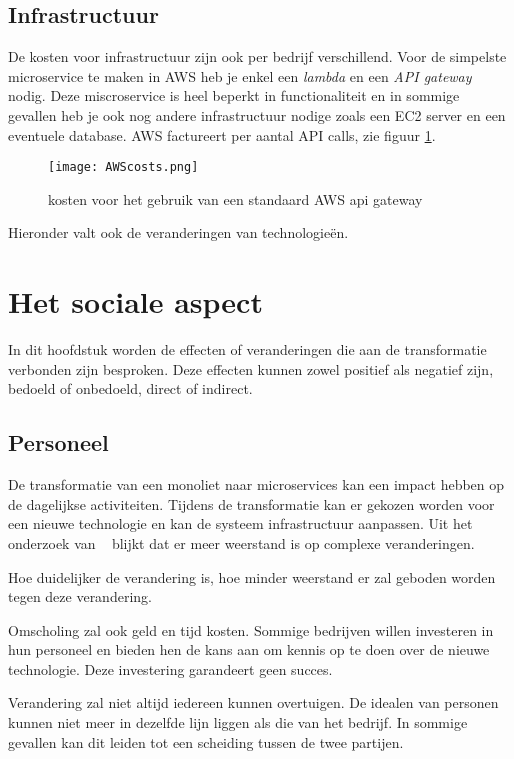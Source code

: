 \subsection{Infrastructuur}

De kosten voor infrastructuur zijn ook per bedrijf verschillend. Voor de simpelste microservice te maken in AWS heb je enkel een \emph{lambda} en een \emph{API gateway} nodig. Deze miscroservice is heel beperkt in functionaliteit en in sommige gevallen heb je ook nog andere infrastructuur nodige zoals een EC2 server en een eventuele database. AWS factureert per aantal API calls, zie figuur \ref{awscost}.

\begin{figure}[!htb]
     \centering
    \texttt{[image: AWScosts.png]}    
    \caption{kosten voor het gebruik van een standaard AWS api gateway \label{awscost}}
\end{figure}

Hieronder valt ook de veranderingen van technologieën.

\section{Het sociale aspect}

In dit hoofdstuk worden de effecten of veranderingen die aan de transformatie verbonden zijn besproken. Deze effecten kunnen zowel positief als negatief zijn, bedoeld of onbedoeld, direct of indirect.

\subsection{Personeel}

De transformatie van een monoliet naar microservices kan een impact hebben op de dagelijkse activiteiten. Tijdens de transformatie kan er gekozen worden voor een nieuwe technologie en kan de systeem infrastructuur aanpassen. Uit het onderzoek van ~\autocite{Schaik2014} blijkt dat er meer weerstand is op complexe veranderingen.  

Hoe duidelijker de verandering is, hoe minder weerstand er zal geboden worden tegen deze verandering.

Omscholing zal ook geld en tijd kosten. Sommige bedrijven willen investeren in hun personeel en bieden hen de kans aan om kennis op te doen over de nieuwe technologie. Deze investering garandeert geen succes.

Verandering zal niet altijd iedereen kunnen overtuigen. De idealen van personen kunnen niet meer in dezelfde lijn liggen als die van het bedrijf. In sommige gevallen kan dit leiden tot een scheiding tussen de twee partijen.

